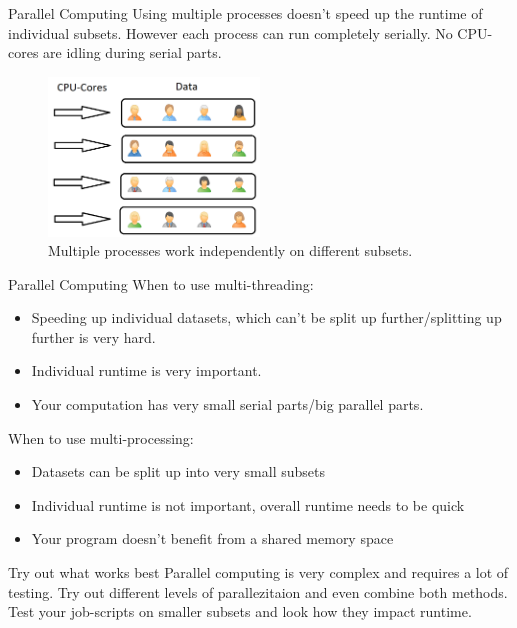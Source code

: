 \documentclass{beamer}
\begin{document}
\begin{frame}{Parallel Computing}
		Using multiple processes doesn't speed up the runtime of individual subsets. However each process can run completely serially. No CPU-cores are idling during serial parts.
\begin{figure}
	\centering
	\includegraphics[width=0.5\textwidth]{process.png}
	\caption{Multiple processes work independently on different subsets.}
\end{figure}
\end{frame}

\begin{frame}{Parallel Computing}
	When to use multi-threading:
	\begin{itemize}
		\item Speeding up individual datasets, which can't be split up further/splitting up further is very hard.
		\item Individual runtime is very important.
		\item Your computation has very small serial parts/big parallel parts.
	\end{itemize}
	When to use multi-processing:
	\begin{itemize}
		\item Datasets can be split up into very small subsets
		\item Individual runtime is not important, overall runtime needs to be quick
		\item Your program doesn't benefit from a shared memory space
	\end{itemize}
	\begin{block}{Try out what works best}
		Parallel computing is very complex and requires a lot of testing. Try out different levels of parallezitaion and even combine both methods. Test your job-scripts on smaller subsets and look how they impact runtime.
	\end{block}
\end{frame}
\end{document}
